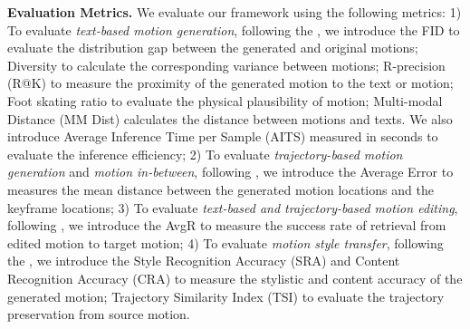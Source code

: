 \noindent\textbf{Evaluation Metrics.} 
We evaluate our framework using the following metrics: 1) To evaluate \textit{text-based motion generation}, following the \cite{chen2023executing}, we introduce the FID to evaluate the distribution gap between the generated and original motions; Diversity to calculate the corresponding variance between motions; R-precision (R@K) to measure the proximity of the generated motion to the text or motion; Foot skating ratio to evaluate the physical plausibility of motion; Multi-modal Distance (MM Dist) calculates the distance between motions and texts. We also introduce Average Inference Time per Sample (AITS) measured in seconds to evaluate the inference efficiency; 2) To evaluate \textit{trajectory-based motion generation} and \textit{motion in-between}, following \cite{xie2023omnicontrol}, we introduce the Average Error to measures the mean distance between the generated motion locations and the keyframe locations; 3) To evaluate  \textit{text-based and trajectory-based motion editing}, following \cite{athanasiou2024motionfix}, we introduce the AvgR to measure the success rate of retrieval from edited motion to target motion; 4) To evaluate \textit{motion style transfer}, following the \cite{Song_2024_CVPR}, we introduce the Style Recognition Accuracy (SRA) and Content Recognition Accuracy (CRA) to measure the stylistic and content accuracy of the generated motion; Trajectory Similarity Index (TSI) to evaluate the trajectory preservation from source motion.

